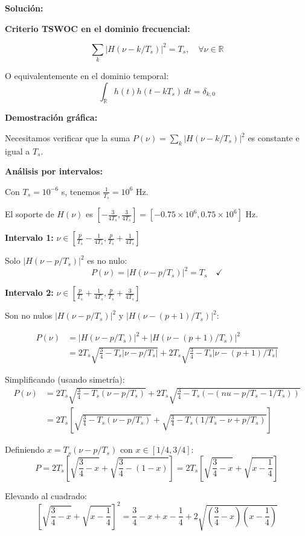 \documentclass[11pt,a4paper]{article}
\begin{document}
\vspace{0.3cm}
\textbf{Soluci\'on:}

\textbf{Criterio TSWOC en el dominio frecuencial:}

\[
\boxed{\sum_k |H(\nu - k/T_s)|^2 = T_s, \quad \forall \nu \in \mathbb{R}}
\]

O equivalentemente en el dominio temporal:
\[
\int_{\mathbb{R}} h(t) h(t - kT_s)\, dt = \delta_{k,0}
\]

\textbf{Demostraci\'on gr\'afica:}

Necesitamos verificar que la suma $P(\nu) = \sum_k |H(\nu - k/T_s)|^2$ es constante e igual a $T_s$.

\textbf{An\'alisis por intervalos:}

Con $T_s = 10^{-6}$ s, tenemos $\frac{1}{T_s} = 10^6$ Hz.

El soporte de $H(\nu)$ es $\left[-\frac{3}{4T_s}, \frac{3}{4T_s}\right] = [-0.75 \times 10^6, 0.75 \times 10^6]$ Hz.

\textbf{Intervalo 1:} $\nu \in \left[\frac{p}{T_s} - \frac{1}{4T_s}, \frac{p}{T_s} + \frac{1}{4T_s}\right]$

Solo $|H(\nu - p/T_s)|^2$ es no nulo:
\[
P(\nu) = |H(\nu - p/T_s)|^2 = T_s \quad ✓
\]

\textbf{Intervalo 2:} $\nu \in \left[\frac{p}{T_s} + \frac{1}{4T_s}, \frac{p}{T_s} + \frac{3}{4T_s}\right]$

Son no nulos $|H(\nu - p/T_s)|^2$ y $|H(\nu - (p+1)/T_s)|^2$:

\begin{align*}
P(\nu) &= |H(\nu - p/T_s)|^2 + |H(\nu - (p+1)/T_s)|^2 \\
&= 2T_s\sqrt{\frac{3}{4} - T_s|\nu - p/T_s|} + 2T_s\sqrt{\frac{3}{4} - T_s|\nu - (p+1)/T_s|}
\end{align*}

Simplificando (usando simetr\'ia):
\begin{align*}
P(\nu) &= 2T_s\sqrt{\frac{3}{4} - T_s(\nu - p/T_s)} + 2T_s\sqrt{\frac{3}{4} - T_s(-(nu - p/T_s - 1/T_s))} \\
&= 2T_s\left[\sqrt{\frac{3}{4} - T_s(\nu - p/T_s)} + \sqrt{\frac{3}{4} - T_s(1/T_s - \nu + p/T_s)}\right]
\end{align*}

Definiendo $x = T_s(\nu - p/T_s)$ con $x \in [1/4, 3/4]$:
\[
P = 2T_s\left[\sqrt{\frac{3}{4} - x} + \sqrt{\frac{3}{4} - (1 - x)}\right] = 2T_s\left[\sqrt{\frac{3}{4} - x} + \sqrt{x - \frac{1}{4}}\right]
\]

Elevando al cuadrado:
\[
\left[\sqrt{\frac{3}{4} - x} + \sqrt{x - \frac{1}{4}}\right]^2 = \frac{3}{4} - x + x - \frac{1}{4} + 2\sqrt{\left(\frac{3}{4} - x\right)\left(x - \frac{1}{4}\right)}
\]
\end{document}

